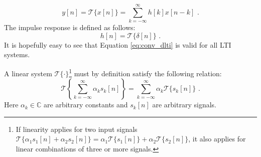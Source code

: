 \begin{equation}
  \boxed{
    y[n] = \mathcal{T}\{x[n]\}=\sum_{k=-\infty}^{\infty} h[k] x[n-k]\,\,.
  }
  \label{eq:conv_dlti}
\end{equation}
The impulse response is defined as follows:
\begin{equation}
  \boxed{
    h[n] = \mathcal{T}\{\delta[n]\}\,\,.
    \label{eq:conv_ireq}
  }
\end{equation}
It is hopefully easy to see that Equation \ref{eq:conv_dlti} is valid for all LTI systems. %

A linear system $\mathcal{T}\{\cdot\}$\footnote{If linearity applies for two input signals $\mathcal{T}\{\alpha_1 s_1[n] + \alpha_2 s_2[n]\} = \alpha_1 \mathcal{T}\{s_1[n]\}+\alpha_2 \mathcal{T}\{s_2[n]\}$, it also applies for linear combinations of three or more signals.} must by definition satisfy the following relation:
\begin{equation}
  \mathcal{T}\left\{\sum_{k=-\infty}^{\infty} \alpha_k s_k[n]\right\} = \sum_{k=-\infty}^{\infty} \alpha_k \mathcal{T}\{s_k[n]\}\,\,.
  \label{eq:linearity_gen}
\end{equation}
Here $\alpha_k \in \mathbb{C}$ are arbitrary constants and $s_k[n]$ are arbitrary signals.

